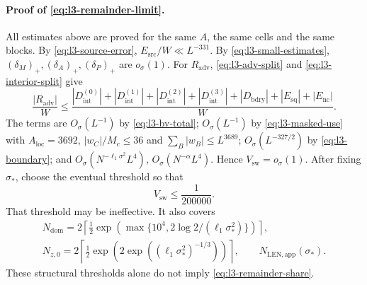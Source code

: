 \paragraph{Proof of \eqref{eq:l3-remainder-limit}.}
All estimates above are proved for the same $A$, the same cells and the
same blocks. By \eqref{eq:l3-source-error}, $E_{\mathrm{src}}/W\ll L^{-331}$.
By \eqref{eq:l3-small-estimates}, $(\delta_M)_+,(\delta_A)_+,(\delta_P)_+$
are $o_\sigma(1)$. For $R_{\mathrm{adv}}$, \eqref{eq:l3-adv-split} and
\eqref{eq:l3-interior-split} give
\[
 \frac{|R_{\mathrm{adv}}|}W\le
 \frac{|D^{(0)}_{\mathrm{int}}|+|D^{(1)}_{\mathrm{int}}|+|D^{(2)}_{\mathrm{int}}|
      +|D^{(3)}_{\mathrm{int}}|+|D_{\mathrm{bdry}}|+|E_{\mathrm{sq}}|+|E_{\mathrm{nc}}|}W .
\]
The terms are $O_\sigma(L^{-1})$ by \eqref{eq:l3-bv-total};
$O_\sigma(L^{-1})$ by \eqref{eq:l3-masked-use} with $A_{\mathrm{loc}}=3692$,
$|w_C|/M_c\le36$ and $\sum_B|w_B|\le L^{3689}$;
$O_\sigma(L^{-327/2})$ by \eqref{eq:l3-boundary};
and $O_\sigma(N^{-\ell_1\sigma^2}L^4)$, $O_\sigma(N^{-\alpha}L^4)$.
Hence $V_{\mathrm{sw}}=o_\sigma(1)$.
After fixing $\sigma_*$, choose the eventual threshold so that
\begin{equation}\label{eq:l3-remainder-share}
 V_{\mathrm{sw}}\le\frac1{200000}.
\end{equation}
That threshold may be ineffective.
It also covers
\begin{equation}\label{eq:l3-structural-thresholds}
\begin{gathered}
 N_{\mathrm{dom}}=2\left\lceil\frac12
  \exp\!\left(\max\{10^4,2\log2/(\ell_1\sigma_*^2)\}\right)\right\rceil,\\
 N_{z,0}=2\left\lceil\frac12
       \exp\!\left(2\exp((\ell_1\sigma_*^2)^{-1/3})\right)\right\rceil,
 \qquad N_{\mathrm{LEN,app}}(\sigma_*).
\end{gathered}
\end{equation}
These structural thresholds alone do not imply \eqref{eq:l3-remainder-share}.

